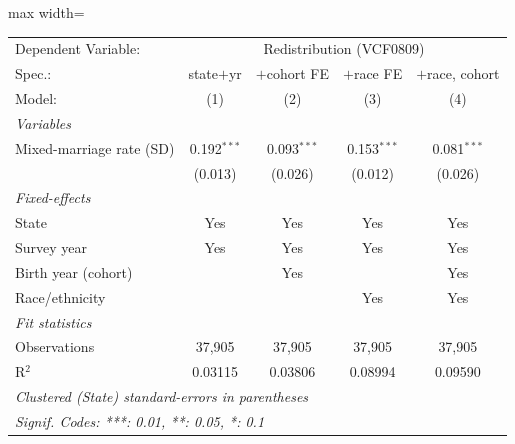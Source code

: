       \begin{adjustbox}{max width=\linewidth}
   \begin{tabular}{lcccc}
      \tabularnewline \midrule \midrule
      Dependent Variable: & \multicolumn{4}{c}{Redistribution (VCF0809)}\\
      Spec.:                   & state$+$yr    & $+$cohort FE  & $+$race FE    & $+$race, cohort \\   
      Model:                   & (1)           & (2)           & (3)           & (4)\\  
      \midrule
      \emph{Variables}\\
      Mixed-marriage rate (SD) & 0.192$^{***}$ & 0.093$^{***}$ & 0.153$^{***}$ & 0.081$^{***}$\\   
                               & (0.013)       & (0.026)       & (0.012)       & (0.026)\\   
      \midrule
      \emph{Fixed-effects}\\
      State                    & Yes           & Yes           & Yes           & Yes\\  
      Survey year              & Yes           & Yes           & Yes           & Yes\\  
      Birth year (cohort)      &               & Yes           &               & Yes\\  
      Race/ethnicity           &               &               & Yes           & Yes\\  
      \midrule
      \emph{Fit statistics}\\
      Observations             & 37,905        & 37,905        & 37,905        & 37,905\\  
      R$^2$                    & 0.03115       & 0.03806       & 0.08994       & 0.09590\\  
      \midrule \midrule
      \multicolumn{5}{l}{\emph{Clustered (State) standard-errors in parentheses}}\\
      \multicolumn{5}{l}{\emph{Signif. Codes: ***: 0.01, **: 0.05, *: 0.1}}\\
   \end{tabular}
      \end{adjustbox}
\vspace{3pt}\par{}
